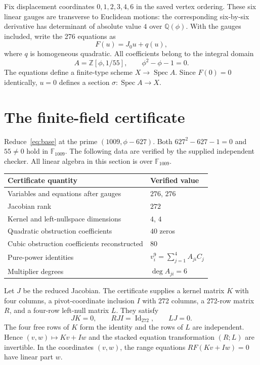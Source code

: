 \documentclass[11pt]{amsart}
\theoremstyle{remark}
\newcommand{\kk}{\mathbb F_{1009}}
\newcommand{\Spec}{\operatorname{Spec}}
\newcommand{\Id}{\operatorname{Id}}
\begin{document}
Fix displacement coordinates $0,1,2,3,4,6$ in the saved vertex ordering. These six linear gauges are transverse to Euclidean motions: the corresponding six-by-six derivative has determinant of absolute value $4$ over $\mathbb Q(\phi)$. With the gauges included, write the 276 equations as
\[
 F(u)=J_0u+q(u),
\]
where $q$ is homogeneous quadratic. All coefficients belong to the integral domain
\begin{equation}\label{eq:base}
 A=\mathbb Z[\phi,1/55],\qquad \phi^2-\phi-1=0.
\end{equation}
The equations define a finite-type scheme $X\to\Spec A$. Since $F(0)=0$ identically, $u=0$ defines a section $\sigma:\Spec A\to X$.

\section{The finite-field certificate}

Reduce~\eqref{eq:base} at the prime $(1009,\phi-627)$. Both $627^2-627-1=0$ and $55\ne0$ hold in $\kk$. The following data are verified by the supplied independent checker. All linear algebra in this section is over $\kk$.

\begin{center}
\begin{tabular}{ll}
\toprule
Certificate quantity & Verified value\\
\midrule
Variables and equations after gauges & $276$, $276$\\
Jacobian rank & $272$\\
Kernel and left-nullspace dimensions & $4$, $4$\\
Quadratic obstruction coefficients & $40$ zeros\\
Cubic obstruction coefficients reconstructed & $80$\\
Pure-power identities & $v_i^9=\sum_{j=1}^4 A_{ji}C_j$\\
Multiplier degrees & $\deg A_{ji}=6$\\
\bottomrule
\end{tabular}
\end{center}

Let $J$ be the reduced Jacobian. The certificate supplies a kernel matrix $K$ with four columns, a pivot-coordinate inclusion $I$ with 272 columns, a 272-row matrix $R$, and a four-row left-null matrix $L$. They satisfy
\begin{equation}\label{eq:linear}
 JK=0,\qquad RJI=\Id_{272},\qquad LJ=0.
\end{equation}
The four free rows of $K$ form the identity and the rows of $L$ are independent. Hence $(v,w)\mapsto Kv+Iw$ and the stacked equation transformation $(R;L)$ are invertible. In the coordinates $(v,w)$, the range equations $RF(Kv+Iw)=0$ have linear part $w$.
\end{document}
